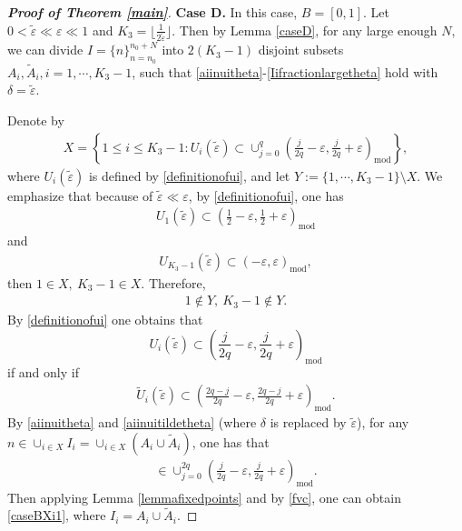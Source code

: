 \documentclass[12pt]{amsart}
\theoremstyle{plain}
\theoremstyle{definition}
\begin{document}
\begin{proof}[\textbf{Proof of Theorem \ref{main}}]
\textbf{Case D.}
 In this case, $B=[0,1]$. Let $0<\tilde{\varepsilon}\ll\varepsilon\ll1$ and $K_3=\lfloor \frac{1}{2\tilde{\varepsilon}}\rfloor$. Then by Lemma \ref{caseD}, for any large enough $N$, we can divide $I=\{n\}_{n=n_0}^{n_0+N}$ into $2(K_3-1)$ disjoint subsets $A_i,\tilde{A}_i,i=1,\cdots,K_3-1$, such that \eqref{aiinuitheta}-\eqref{Iifractionlargetheta} hold with $\delta=\tilde{\varepsilon}$. 
		
		Denote by 
\begin{align}
X=\left\{1\leq i\leq K_3-1: U_i(\tilde{\varepsilon})\subset \cup_{j=0}^q\left(\frac{j}{2q}-\varepsilon,\frac{j}{2q}+\varepsilon\right)_{\mathrm{mod}}\right\},\nonumber
\end{align}
where 
 $U_i(\tilde{\varepsilon})$ is defined by \eqref{definitionofui},
and let $Y:=\{1,\cdots,K_3-1\}\setminus X$. We emphasize that because of $\tilde{\varepsilon}\ll\varepsilon$, by \eqref{definitionofui}, one has
\begin{align}
	U_1(\tilde{\varepsilon})\subset \left(\frac{1}{2}-\varepsilon,\frac{1}{2}+\varepsilon\right)_{\mathrm{mod}}\nonumber
\end{align}
and
\begin{align}
	U_{K_3-1}(\tilde{\varepsilon})\subset \left(-\varepsilon,\varepsilon\right)_{\mathrm{mod}}\nonumber,
\end{align}
then
	$1\in X,\ K_3-1\in X.$
Therefore,
\begin{align}
	1\notin Y,\ K_3-1\notin Y.\label{fiyno}
\end{align}
By \eqref{definitionofui} one obtains that $$U_i(\tilde{\varepsilon})\subset \left(\frac{j}{2q}-\varepsilon,\frac{j}{2q}+\varepsilon\right)_{\mathrm{mod}}$$ 
if and only if 
\begin{align}
\tilde{U}_i(\tilde{\varepsilon})\subset \left(\frac{2q-j}{2q}-\varepsilon,\frac{2q-j}{2q}+\varepsilon\right)_{\mathrm{mod}}.\nonumber
\end{align}
By \eqref{aiinuitheta} and \eqref{aiinuitildetheta} (where $\delta$ is replaced by $\tilde{\varepsilon}$), for any $n\in \cup_{i\in X} I_i=\cup_{i\in X}\left(A_i\cup \tilde{A}_i\right)$, one has that 
\begin{align}
[\theta(nq)]\in \cup_{j=0}^{2q}{\left(\frac{j}{2q}-\varepsilon,\frac{j}{2q}+\varepsilon\right)_{\mathrm{mod}}}.\nonumber
\end{align}
Then applying Lemma \ref{lemmafixedpoints} and by \eqref{fvc}, one can obtain \eqref{caseBXi1}, where $I_i=A_i\cup\tilde{A}_i$.


\end{proof}
\end{document}
